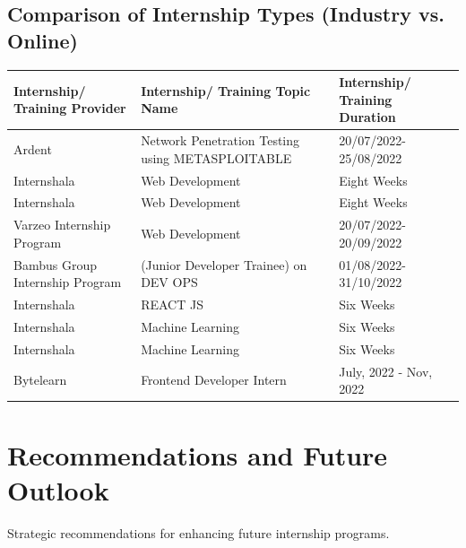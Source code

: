 \documentclass[11pt,a4paper]{article}
\newenvironment{card}{
    \begin{tcolorbox}[
        enhanced,
        colback=cardback,
        colframe=border,
        sharp corners,
        boxrule=0.5pt,
        drop shadow,
        drop shadow={shadow xshift=1mm,shadow yshift=-1mm,fill=border!50},
        boxsep=3mm,
        left=5mm, right=5mm, top=5mm, bottom=5mm,
        width=\textwidth,
        nobeforeafter
    ]
}{\end{tcolorbox}}
\begin{document}
\vspace{0.5cm}

\begin{card}
    \subsection*{\textcolor{accent}{Comparison of Internship Types (Industry vs. Online)}}
    \vspace{0.3cm}
    \begin{longtable}{@{}p{}p{}p{}@{}}
        \toprule
        \textbf{Internship/ Training Provider} & \textbf{Internship/ Training Topic Name} & \textbf{Internship/ Training Duration} \\
        \midrule
        \endhead
        Ardent & Network Penetration Testing using METASPLOITABLE & 20/07/2022-25/08/2022 \\
        Internshala & Web Development & Eight Weeks \\
        Internshala & Web Development & Eight Weeks \\
        Varzeo Internship Program & Web Development & 20/07/2022-20/09/2022 \\
        Bambus Group Internship Program & (Junior Developer Trainee) on DEV OPS & 01/08/2022-31/10/2022 \\
        Internshala & REACT JS & Six Weeks \\
        Internshala & Machine Learning & Six Weeks \\
        Internshala & Machine Learning & Six Weeks \\
        Bytelearn & Frontend Developer Intern & July, 2022 - Nov, 2022 \\
        \bottomrule
    \end{longtable}
\end{card}

\clearpage

\section*{\textcolor{accent}{Recommendations and Future Outlook}}
{\large\textcolor{muted}{Strategic recommendations for enhancing future internship programs.}}

\vspace{0.5cm}
\end{document}

